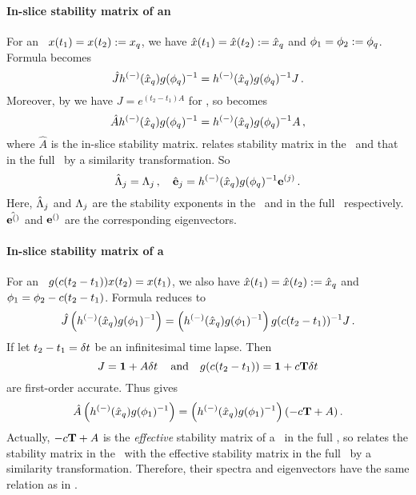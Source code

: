 \paragraph{In-slice stability matrix of an \eqv}
For an \eqv\ $x(t_1) = x(t_2) := x_q$, we have
$\hat{x}(t_1)=\hat{x}(t_2) :=\hat{x}_q$ and
${\bf \phi}_{1}={\bf \phi}_{2} := {\bf \phi}_q$.
Formula  becomes
\begin{equation}
  \hat{\jMps}\pMatM
  (\sspRed_q)\LieEl(\gSpace_q)^{-1}=
  \pMatM(\sspRed_q)\LieEl(\gSpace_q)^{-1}\jMps
  \,.
  \label{eq:Jeqv0}
\end{equation}
Moreover, by  we have $J=e^{(t_2-t_1)A}$
for \eqva, so  becomes
\begin{equation}
  \hat{A} \pMatM
  (\sspRed_q)\LieEl(\gSpace_q)^{-1}=
  \pMatM(\sspRed_q)\LieEl(\gSpace_q)^{-1}A
  \,,
  \label{eq:Jeqv1}
\end{equation}
where $\hat{A}$ is the in-slice stability matrix.
 relates stability matrix in the \slice\ and that in the
full \statesp\ by a similarity transformation.
So
\begin{equation}
  \label{eq:Jeqv}
  \hat{\ExpaEig}_{j} = \ExpaEig_{j} \,, \quad
  \jEigvecRed[j] = \pMatM(\sspRed_q)\LieEl(\gSpace_q)^{-1} \jEigvec[j]
  \,.
\end{equation}
Here, $\hat{\Lambda}_{j}$ and $\Lambda_{j}$ are the
stability exponents in the \slice\ and in the full \statesp\ respectively.
$\hat{{\bf e}^{()}}$ and ${\bf e}^{()}$ are the corresponding eigenvectors.

\paragraph{In-slice stability matrix of a \reqv}
For an \reqv\ $g(c(t_2-t_1)) x(t_2) =  x(t_1)$,
we also have $\hat{x}(t_1)=\hat{x}(t_2) :=\hat{x}_q$ and
${\bf \phi}_{1} = {\bf \phi}_{2} - c (t_2 - t_1)$. Formula
 reduces to
\begin{equation}
  \hat{\jMps} \left( \pMatM(\sspRed_q)\LieEl(\gSpace_1)^{-1} \right) =
  \left( \pMatM(\sspRed_q)\LieEl(\gSpace_1)^{-1} \right)
  \LieEl(c(t_2-t_1))^{-1}\jMps
  \,.
  \label{eq:Jreqv0}
\end{equation}
If let $t_2 - t_1 = \delta t$ be an infinitesimal time
lapse. Then
\[
  J = {\bf 1} + A \delta t \,\quad
  \text{and} \quad
  g(c(t_2 - t_1)) = {\bf 1} + c\mathbf{T} \delta t
\]
are
first-order accurate. Thus  gives
\begin{equation}
  \label{eq:Jreqv1}
  \hat{A} \left( \pMatM(\sspRed_q)\LieEl(\gSpace_1)^{-1} \right) =
  \left( \pMatM(\sspRed_q)\LieEl(\gSpace_1)^{-1} \right)
  (-c\Lg + A)
  \,.
\end{equation}
Actually, $-c\mathbf{T} + A$ is the \emph{effective} stability matrix of
a \reqv\ in the full \statesp, so 
relates the stability matrix in the \slice\ with the effective stability matrix
in the full \statesp\ by a similarity transformation. Therefore,
their spectra and eigenvectors have the same relation as in
.

